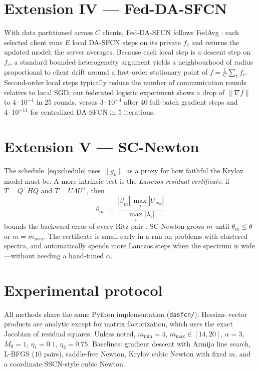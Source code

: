 \documentclass[11pt,a4paper]{article}
\theoremstyle{definition}
\begin{document}
\section{Extension IV --- Fed-DA-SFCN}
With data partitioned across $C$ clients, Fed-DA-SFCN follows FedAvg
\cite{mcmahan2017}: each selected client runs $E$ local DA-SFCN steps on
its private $f_c$ and returns the updated model; the server averages.
Because each local step is a descent step on $f_c$, a standard
bounded-heterogeneity argument yields a neighbourhood of radius
proportional to client drift around a first-order stationary point of
$f=\frac1C\sum_c f_c$. Second-order local steps typically reduce the
number of communication rounds relative to local SGD; our federated
logistic experiment shows a drop of $\|\nabla f\|$ to $4\cdot 10^{-4}$
in 25 rounds, versus $3\cdot 10^{-4}$ after 40 full-batch gradient steps
and $4\cdot 10^{-11}$ for centralized DA-SFCN in 5 iterations.

\section{Extension V --- SC-Newton}
The schedule~\eqref{eq:schedule} uses $\|g_k\|$ as a proxy for how
faithful the Krylov model must be. A more intrinsic test is the
\emph{Lanczos residual certificate}: if $T=Q^\top HQ$ and
$T=U\Lambda U^\top$, then
\begin{equation}\label{eq:cert}
\theta_m
\;=\;
\frac{|\beta_m|\,\max_j |U_{m j}|}{\max_i|\lambda_i|}
\end{equation}
bounds the backward error of every Ritz pair \cite{saad2003}.
SC-Newton grows $m$ until $\theta_m\le\theta$ or $m=m_{\max}$.
The certificate is small early in a run on problems with clustered
spectra, and automatically spends more Lanczos steps when the spectrum
is wide---without needing a hand-tuned $\alpha$.

\section{Experimental protocol}
All methods share the same Python implementation (\texttt{dasfcn/}).
Hessian--vector products are analytic except for matrix factorization,
which uses the exact Jacobian of residual squares.
Unless noted, $m_{\min}=4$, $m_{\max}\in[14,20]$, $\alpha=3$,
$M_0=1$, $\eta_1=0.1$, $\eta_2=0.75$.
Baselines: gradient descent with Armijo line search, L-BFGS ($10$ pairs),
saddle-free Newton, Krylov cubic Newton with fixed $m$, and a coordinate
SSCN-style cubic Newton.
\end{document}
